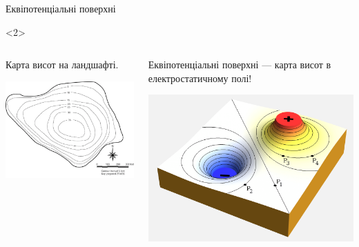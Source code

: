 \documentclass{beamer}
\begin{document}
\begin{frame}{Еквіпотенціальні поверхні}
\begin{onlyenv}
	\end{onlyenv}
	\begin{onlyenv}
		\begin{columns}
			\begin{column}{0.5\linewidth}
				\begin{block}{}\centering
					Карта висот на ландшафті.
				\end{block}
				\begin{center}
					\includegraphics[width=\linewidth]{ContourMap}
				\end{center}
			\end{column}
			\begin{column}{0.5\linewidth}
				\begin{alertblock}{}\justifying\centering
					Еквіпотенціальні поверхні --- карта висот в електростатичному полі!
				\end{alertblock}
				\begin{center}
					\includegraphics[width=\linewidth]{ep3d}

\end{center}
\end{column}
\end{columns}
\end{onlyenv}
\end{frame}
\end{document}
